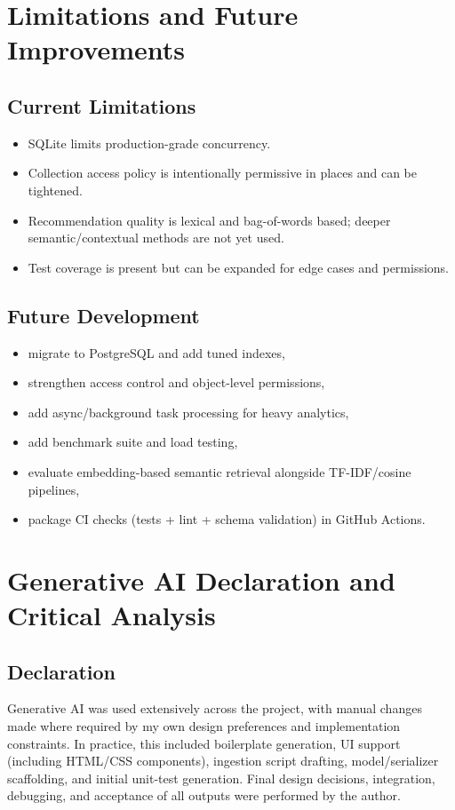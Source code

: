 \documentclass[11pt,a4paper]{article}
\begin{document}
\section{Limitations and Future Improvements}
\subsection{Current Limitations}
\begin{itemize}[leftmargin=*]
	\item SQLite limits production-grade concurrency.
	\item Collection access policy is intentionally permissive in places and can be tightened.
	\item Recommendation quality is lexical and bag-of-words based; deeper semantic/contextual methods are not yet used.
	\item Test coverage is present but can be expanded for edge cases and permissions.
\end{itemize}

\subsection{Future Development}
\begin{itemize}[leftmargin=*]
	\item migrate to PostgreSQL and add tuned indexes,
	\item strengthen access control and object-level permissions,
	\item add async/background task processing for heavy analytics,
	\item add benchmark suite and load testing,
	\item evaluate embedding-based semantic retrieval alongside TF-IDF/cosine pipelines,
	\item package CI checks (tests + lint + schema validation) in GitHub Actions.
\end{itemize}

\section{Generative AI Declaration and Critical Analysis}
\subsection*{Declaration}
Generative AI was used extensively across the project, with manual changes made where required by my own design preferences and implementation constraints. In practice, this included boilerplate generation, UI support (including HTML/CSS components), ingestion script drafting, model/serializer scaffolding, and initial unit-test generation. Final design decisions, integration, debugging, and acceptance of all outputs were performed by the author.
\end{document}
